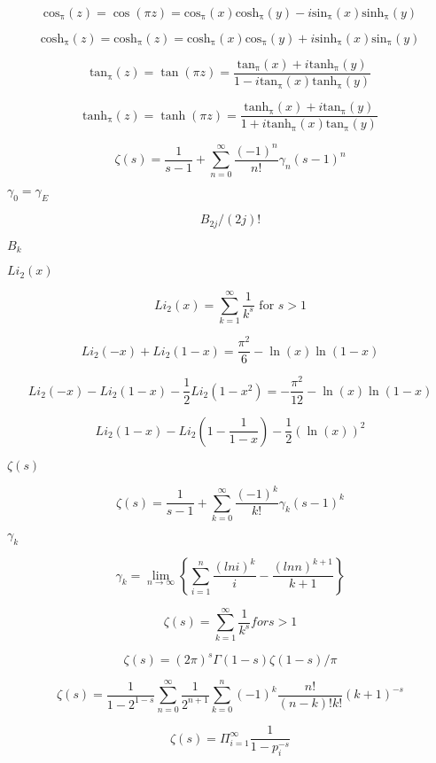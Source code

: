 \documentclass{article}
\begin{document}
\[ \mathrm{cos_\pi}(z) = \cos(\pi z) = \mathrm{cos_\pi}(x) \mathrm{cosh_\pi}(y) - i \mathrm{sin_\pi}(x) \mathrm{sinh_\pi}(y) \]
\pagebreak

\[ \mathrm{cosh_\pi}(z) = \mathrm{cosh_\pi}(z) = \mathrm{cosh_\pi}(x) \mathrm{cos_\pi}(y) + i \mathrm{sinh_\pi}(x) \mathrm{sin_\pi}(y) \]
\pagebreak

\[ \mathrm{tan_\pi}(z) = \tan(\pi z) = \frac{\mathrm{tan_\pi}(x) + i \mathrm{tanh_\pi}(y)} {1 - i \mathrm{tan_\pi}(x) \mathrm{tanh_\pi}(y)} \]
\pagebreak

\[ \mathrm{tanh_\pi}(z) = \tanh(\pi z) = \frac{\mathrm{tanh_\pi}(x) + i \mathrm{tan_\pi}(y)} {1 + i \mathrm{tanh_\pi}(x) \mathrm{tan_\pi}(y)} \]
\pagebreak

\[ \zeta(s) = \frac{1}{s-1} + \sum_{n=0}^{\infty}\frac{(-1)^n}{n!}\gamma_n(s-1)^n \]
\pagebreak

$ \gamma_0 = \gamma_E $
\pagebreak

\[ B_{2j} / (2j)! \]
\pagebreak

$ B_k $
\pagebreak

$ Li_2(x) $
\pagebreak

\[ Li_2(x) = \sum_{k=1}^{\infty} \frac{1}{k^{s}} \mbox{ for } s > 1 \]
\pagebreak

\[ Li_2(-x) + Li_2(1-x) = \frac{\pi^2}{6} - \ln(x) \ln(1-x) \]
\pagebreak

\[ Li_2(-x) - Li_2(1-x) - \frac{1}{2}Li_2(1-x^2) = -\frac{\pi^2}{12} - \ln(x) \ln(1-x) \]
\pagebreak

\[ Li_2(1-x) - Li_2(1-\frac{1}{1-x}) - \frac{1}{2}(\ln(x))^2 \]
\pagebreak

$ \zeta(s) $
\pagebreak

\[ \zeta(s) = \frac{1}{s-1} + \sum_{k=0}^{\infty} \frac{(-1)^k}{k!}\gamma_k (s-1)^k \]
\pagebreak

$ \gamma_k $
\pagebreak

\[ \gamma_k = \lim_{n \to \infty} \left\{ \sum_{i=1}^{n}\frac{(ln i)^k}{i} - \frac{(ln n)^{k+1}}{k+1} \right\} \]
\pagebreak

\[ \zeta(s) = \sum_{k=1}^{\infty} \frac{1}{k^{s}} for s > 1 \]
\pagebreak

\[ \zeta(s) = (2\pi)^s \Gamma(1-s) \zeta(1-s) / \pi \]
\pagebreak

\[ \zeta(s) = \frac{1}{1-2^{1-s}} \sum_{n=0}^{\infty} \frac{1}{2^{n+1}} \sum_{k=0}^{n} (-1)^k \frac{n!}{(n-k)!k!} (k+1)^{-s} \]
\pagebreak

\[ \zeta(s) = \Pi_{i=1}^\infty \frac{1}{1 - p_i^{-s}} \]
\pagebreak
\end{document}
